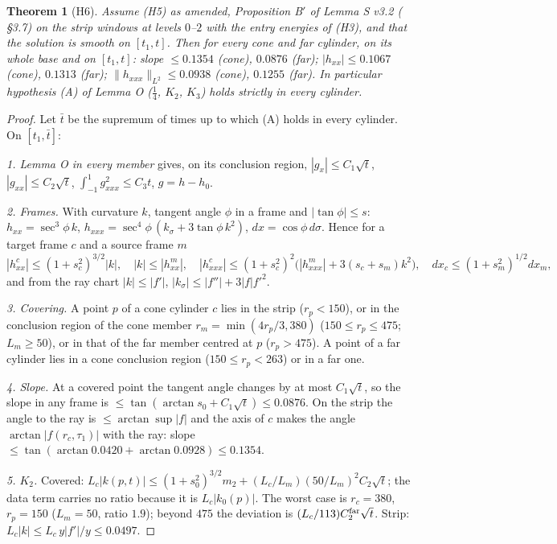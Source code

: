 \documentclass[11pt]{article}
\newtheorem{theorem}{Theorem}\newtheorem{proposition}[theorem]{Proposition}
\newcommand{\fn}[1]{\texttt{\detokenize{#1}}}
\begin{document}
\begin{theorem}[H6]\label{thm:H6}
Assume (H5) as amended, Proposition B$'$ of Lemma S v3.2 (\fn{step3_proof_v32.tex} \S3.7) on the strip windows at levels $0$--$2$ with the entry energies of (H3), and that the solution is smooth on $[t_1,t]$. Then for every cone and far cylinder, on its whole base and on $[t_1,t]$: slope $\le0.1354$ (cone), $0.0876$ (far); $|h_{xx}|\le0.1067$ (cone), $0.1313$ (far); $\|h_{xxx}\|_{L^2}\le0.0938$ (cone), $0.1255$ (far). In particular hypothesis (A) of Lemma O ($\tfrac14$, $K_2$, $K_3$) holds strictly in every cylinder.
\end{theorem}
\begin{proof}
Let $\bar t$ be the supremum of times up to which (A) holds in every cylinder. On $[t_1,\bar t]$:

\emph{1. Lemma O in every member} gives, on its conclusion region, $|g_x|\le C_1\sqrt t$, $|g_{xx}|\le C_2\sqrt t$, $\int_{-1}^1g_{xxx}^2\le C_3t$, $g=h-h_0$.

\emph{2. Frames.} With curvature $k$, tangent angle $\phi$ in a frame and $|\tan\phi|\le s$: $h_{xx}=\sec^3\!\phi\,k$, $h_{xxx}=\sec^4\!\phi\,(k_\sigma+3\tan\phi\,k^2)$, $dx=\cos\phi\,d\sigma$. Hence for a target frame $c$ and a source frame $m$
\[|h^c_{xx}|\le(1+s_c^2)^{3/2}|k|,\quad|k|\le|h^m_{xx}|,\quad|h^c_{xxx}|\le(1+s_c^2)^2\bigl(|h^m_{xxx}|+3(s_c+s_m)k^2\bigr),\quad dx_c\le(1+s_m^2)^{1/2}dx_m,\]
and from the ray chart $|k|\le|f'|$, $|k_\sigma|\le|f''|+3|f|f'^2$.

\emph{3. Covering.} A point $p$ of a cone cylinder $c$ lies in the strip ($r_p<150$), or in the conclusion region of the cone member $r_m=\min(4r_p/3,380)$ ($150\le r_p\le475$; $L_m\ge50$), or in that of the far member centred at $p$ ($r_p>475$). A point of a far cylinder lies in a cone conclusion region ($150\le r_p<263$) or in a far one.

\emph{4. Slope.} At a covered point the tangent angle changes by at most $C_1\sqrt t$, so the slope in any frame is $\le\tan(\arctan s_0+C_1\sqrt t)\le0.0876$. On the strip the angle to the ray is $\le\arctan\sup|f|$ and the axis of $c$ makes the angle $\arctan|f(r_c,\tau_1)|$ with the ray: slope $\le\tan(\arctan0.0420+\arctan0.0928)\le0.1354$.

\emph{5. $K_2$.} Covered: $L_c|k(p,t)|\le(1+s_0^2)^{3/2}m_2+(L_c/L_m)(50/L_m)^2C_2\sqrt t$; the data term carries no ratio because it is $L_c|k_0(p)|$. The worst case is $r_c=380$, $r_p=150$ ($L_m=50$, ratio $1.9$); beyond $475$ the deviation is $(L_c/113)C_2^{\rm far}\sqrt t$. Strip: $L_c|k|\le L_c\,y|f'|/y\le0.0497$.


\end{proof}
\end{document}
